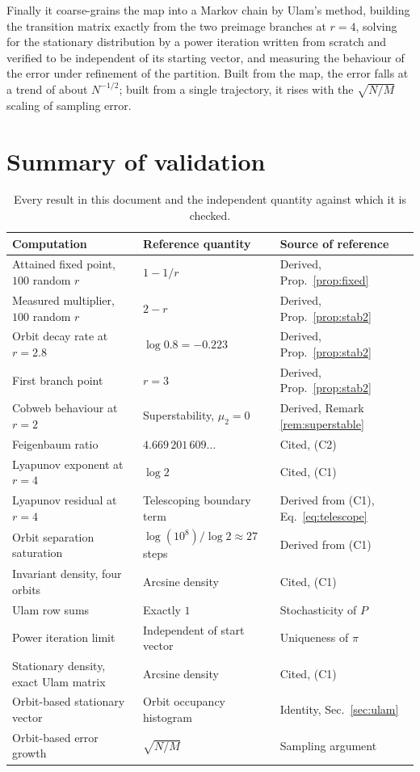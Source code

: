\documentclass[11pt,a4paper]{article}
\theoremstyle{definition}
\theoremstyle{remark}
\begin{document}
Finally it coarse-grains the map into a Markov chain by Ulam's method,
building the transition matrix exactly from the two preimage branches at
$r=4$, solving for the stationary distribution by a power iteration written
from scratch and verified to be independent of its starting vector, and
measuring the behaviour of the error under refinement of the partition. Built
from the map, the error falls at a trend of about $N^{-1/2}$; built from a
single trajectory, it rises with the $\sqrt{N/M}$ scaling of sampling error.

\appendix

\section{Summary of validation}

\begin{table}[H]
\centering
\small
\begin{tabular}{p{4.3cm}p{4.3cm}p{4.6cm}}
\toprule
Computation & Reference quantity & Source of reference \\
\midrule
Attained fixed point, $100$ random $r$ & $1-1/r$ & Derived, Prop.\ \ref{prop:fixed} \\
Measured multiplier, $100$ random $r$ & $2-r$ & Derived, Prop.\ \ref{prop:stab2} \\
Orbit decay rate at $r=2.8$ & $\log 0.8 = -0.223$ & Derived, Prop.\ \ref{prop:stab2} \\
First branch point & $r=3$ & Derived, Prop.\ \ref{prop:stab2} \\
Cobweb behaviour at $r=2$ & Superstability, $\mu_2=0$ & Derived, Remark \ref{rem:superstable} \\
Feigenbaum ratio & $4.669\,201\,609\ldots$ & Cited, (C2) \\
Lyapunov exponent at $r=4$ & $\log 2$ & Cited, (C1) \\
Lyapunov residual at $r=4$ & Telescoping boundary term & Derived from (C1), Eq.\ \eqref{eq:telescope} \\
Orbit separation saturation & $\log(10^8)/\log 2 \approx 27$ steps & Derived from (C1) \\
Invariant density, four orbits & Arcsine density & Cited, (C1) \\
Ulam row sums & Exactly $1$ & Stochasticity of $P$ \\
Power iteration limit & Independent of start vector & Uniqueness of $\pi$ \\
Stationary density, exact Ulam matrix & Arcsine density & Cited, (C1) \\
Orbit-based stationary vector & Orbit occupancy histogram & Identity, Sec.\ \ref{sec:ulam} \\
Orbit-based error growth & $\sqrt{N/M}$ & Sampling argument \\
\bottomrule
\end{tabular}
\caption{Every result in this document and the independent quantity against
which it is checked.}
\label{tab:validation}
\end{table}
\end{document}
